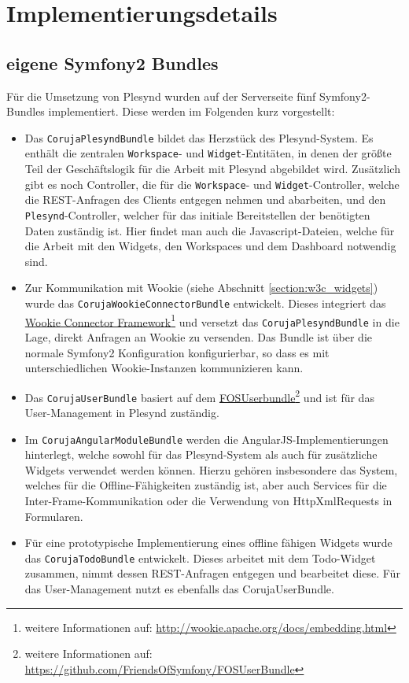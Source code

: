 \section{Implementierungsdetails}\label{section:implementierungsdetails}

\subsection{eigene Symfony2 Bundles}\label{section:backend}
Für die Umsetzung von Plesynd wurden auf der Serverseite fünf Symfony2-Bundles implementiert. Diese werden im Folgenden kurz vorgestellt:

\begin{itemize}
\item Das \texttt{CorujaPlesyndBundle} bildet das Herzstück des Plesynd-System. Es enthält die zentralen \texttt{Workspace}- und \texttt{Widget}-Entitäten, in denen der größte Teil der Geschäftslogik für die Arbeit mit Plesynd abgebildet wird. Zusätzlich gibt es noch Controller, die für die \texttt{Workspace}- und \texttt{Widget}-Controller, welche die REST-Anfragen des Clients entgegen nehmen und abarbeiten, und den \texttt{Plesynd}-Controller, welcher für das initiale Bereitstellen der benötigten Daten zuständig ist. Hier findet man auch die Javascript-Dateien, welche für die Arbeit mit den Widgets, den Workspaces und dem Dashboard notwendig sind.
\item Zur Kommunikation mit Wookie (siehe Abschnitt \ref{section:w3c_widgets}) wurde das \texttt{CorujaWookieConnectorBundle} entwickelt. Dieses integriert das \href{http://wookie.apache.org/docs/embedding.html}{Wookie Connector Framework}\footnote{weitere Informationen auf: \url{http://wookie.apache.org/docs/embedding.html}} und versetzt das \texttt{CorujaPlesyndBundle} in die Lage, direkt Anfragen an Wookie zu versenden. Das Bundle ist über die normale Symfony2 Konfiguration konfigurierbar, so dass es mit unterschiedlichen Wookie-Instanzen kommunizieren kann.
\item Das \texttt{CorujaUserBundle} basiert auf dem \href{https://github.com/FriendsOfSymfony/FOSUserBundle}{FOSUserbundle}\footnote{weitere Informationen auf: \url{https://github.com/FriendsOfSymfony/FOSUserBundle}} und ist für das User-Management in Plesynd zuständig.
\item Im \texttt{CorujaAngularModuleBundle} werden die AngularJS-Implementierungen hinterlegt, welche sowohl für das Plesynd-System als auch für zusätzliche Widgets verwendet werden können. Hierzu gehören insbesondere das System, welches für die Offline-Fähigkeiten zuständig ist, aber auch Services für die Inter-Frame-Kommunikation oder die Verwendung von HttpXmlRequests in Formularen.  
\item Für eine prototypische Implementierung eines offline fähigen Widgets wurde das \texttt{CorujaTodoBundle} entwickelt. Dieses arbeitet mit dem Todo-Widget zusammen, nimmt dessen REST-Anfragen entgegen und bearbeitet diese. Für das User-Management nutzt es ebenfalls das CorujaUserBundle.
\end{itemize}


